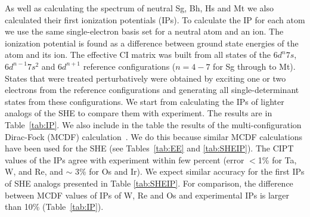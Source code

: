 \documentclass[10pt,a4paper, twoside, openright]{report}
\begin{document}
As well as calculating the spectrum of neutral Sg, Bh, Hs and Mt we also calculated their first ionization potentials (IPs). To calculate the IP for each atom we use the same single-electron basis set for a neutral atom and an ion. The ionization potential is found as a difference between ground state energies of the atom and its ion. The effective CI matrix was built from all states of the $6d^n 7s$, $6d^{n-1}7s^2$ and $6d^{n+1}$ reference configurations ($n=4-7$ for Sg through to Mt). States that were treated perturbatively were obtained by exciting one or two electrons from the reference configurations and generating all single-determinant states from these configurations. We start from calculating the IPs of lighter analogs of the SHE to compare them with experiment. The results are in Table~\ref{tab:IP}. We also include in the table the results of the multi-configuration Dirac-Fock (MCDF) calculation~\cite{Johnson1999, Johnson2002}. We do this because similar MCDF calculations have been used for the SHE (see Tables~\ref{tab:EE} and \ref{tab:SHEIP}). The CIPT values of the IPs agree with experiment within few percent (error $<$1\% for Ta, W, and Re, and $\sim$ 3\% for Os and Ir). We expect similar accuracy for the first IPs of SHE analogs presented in Table \ref{tab:SHEIP}.  For comparison, the difference between MCDF values of IPs of W, Re and Os and experimental IPs is larger than 10\% (Table~\ref{tab:IP}).
\end{document}
